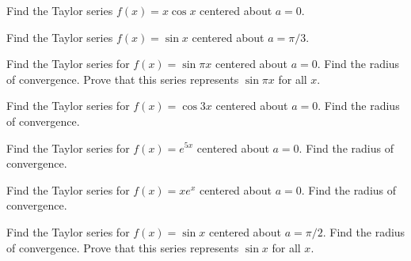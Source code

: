 \begin{exercise}
Find the Taylor series $f(x) = x \cos x$ centered about $a = 0$.
\end{exercise}

\begin{exercise}
Find the Taylor series $f(x) = \sin x$ centered about $a = \pi/3$.
\end{exercise}

\begin{exercise}
Find the Taylor series for $f(x) = \sin \pi x$ centered about $a = 0$. Find the radius of convergence. Prove that this series represents $\sin \pi x$ for all $x$.
\end{exercise}

\begin{exercise}
Find the Taylor series for $f(x) = \cos 3x$ centered about $a = 0$. Find the radius of convergence.
\end{exercise}

\begin{exercise}
Find the Taylor series for $f(x) = e^{5x}$ centered about $a = 0$. Find the radius of convergence.
\end{exercise}

\begin{exercise}
Find the Taylor series for $f(x) = xe^{x}$ centered about $a = 0$. Find the radius of convergence.
\end{exercise}

\begin{exercise}
Find the Taylor series for $f(x) = \sin x$ centered about $a = \pi/2$. Find the radius of convergence. Prove that this series represents $\sin x$ for all $x$.
\end{exercise}

